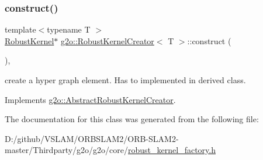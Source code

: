 \subsubsection{\texorpdfstring{construct()}{construct()}}
{\footnotesize\ttfamily template$<$typename T $>$ \\
\mbox{\hyperlink{classg2o_1_1_robust_kernel}{Robust\+Kernel}}$\ast$ \mbox{\hyperlink{classg2o_1_1_robust_kernel_creator}{g2o\+::\+Robust\+Kernel\+Creator}}$<$ T $>$\+::construct (\begin{DoxyParamCaption}{ }\end{DoxyParamCaption})\hspace{0.3cm}{\ttfamily [inline]}, {\ttfamily [virtual]}}

create a hyper graph element. Has to implemented in derived class. 

Implements \mbox{\hyperlink{classg2o_1_1_abstract_robust_kernel_creator_a3022ab9279e52151d37f8cb4d1524d47}{g2o\+::\+Abstract\+Robust\+Kernel\+Creator}}.



The documentation for this class was generated from the following file\+:\begin{DoxyCompactItemize}
\item 
D\+:/github/\+V\+S\+L\+A\+M/\+O\+R\+B\+S\+L\+A\+M2/\+O\+R\+B-\/\+S\+L\+A\+M2-\/master/\+Thirdparty/g2o/g2o/core/\mbox{\hyperlink{robust__kernel__factory_8h}{robust\+\_\+kernel\+\_\+factory.\+h}}\end{DoxyCompactItemize}
